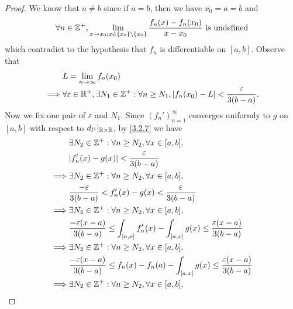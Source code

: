 \begin{proof}
  We know that \(a \neq b\) since if \(a = b\), then we have \(x_0 = a = b\) and
  \[
    \forall n \in \mathbb{Z}^+, \lim_{x \to x_0; x \in \{x_0\} \setminus \{x_0\}} \dfrac{f_n(x) - f_n(x_0)}{x - x_0} \text{ is undefined}
  \]
  which contradict to the hypothesis that \(f_n\) is differentiable on \([a, b]\).
  Observe that
  \begin{align*}
             & L = \lim_{n \to \infty} f_n(x_0)                                                                                             \\
    \implies & \forall \varepsilon \in \mathbb{R}^+, \exists N_1 \in \mathbb{Z}^+ : \forall n \geq N_1, \left\lvert f_n(x_0) - L\right\rvert < \dfrac{\varepsilon}{3(b - a)}.
  \end{align*}
  Now we fix one pair of \(\varepsilon\) and \(N_1\).
  Since \((f_n')_{n = 1}^\infty\) converges uniformly to \(g\) on \([a, b]\) with respect to \(d_{l^1}|_{\mathbb{R} \times \mathbb{R}}\), by \cref{3.2.7} we have
  \begin{align*}
             & \exists N_2 \in \Z^+ : \forall n \geq N_2, \forall x \in [a, b],                                                                  \\
             & \abs{f_n'(x) - g(x)} < \dfrac{\varepsilon}{3(b - a)}                                                                              \\
    \implies & \exists N_2 \in \Z^+ : \forall n \geq N_2, \forall x \in [a, b],                                                                  \\
             & \dfrac{-\varepsilon}{3(b - a)} < f_n'(x) - g(x) < \dfrac{\varepsilon}{3(b - a)}                                                   \\
    \implies & \exists N_2 \in \Z^+ : \forall n \geq N_2, \forall x \in [a, b],                                                                  \\
             & \dfrac{-\varepsilon (x - a)}{3(b - a)} \leq \int_{[a, x]} f_n'(x) - \int_{[a, x]} g(x) \leq \dfrac{\varepsilon (x - a)}{3(b - a)} \\
    \implies & \exists N_2 \in \Z^+ : \forall n \geq N_2, \forall x \in [a, b],                                                                  \\
             & \dfrac{-\varepsilon (x - a)}{3(b - a)} \leq f_n(x) - f_n(a) - \int_{[a, x]} g(x) \leq \dfrac{\varepsilon (x - a)}{3(b - a)}       \\
    \implies & \exists N_2 \in \Z^+ : \forall n \geq N_2, \forall x \in [a, b],                                                                  \\

\end{align*}
\end{proof}

